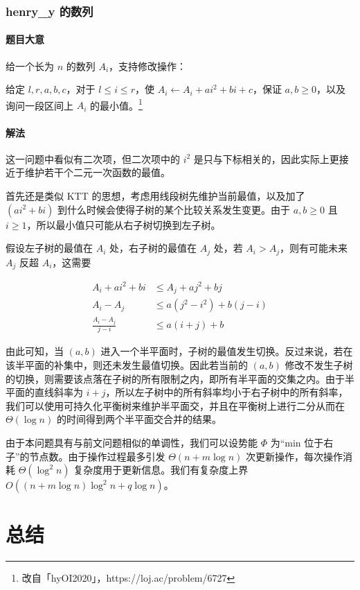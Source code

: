\documentclass{noithesis}
\begin{document}
\subsubsection{henry\_y 的数列}

\paragraph{题目大意} 给一个长为 $n$ 的数列 $A_i$，支持修改操作：

给定 $l, r, a, b, c$，对于 $l\le i\le r$，使 $A_i \leftarrow A_i + ai^2 + bi + c$，保证 $a, b\ge 0$，以及询问一段区间上 $A_i$ 的最小值。\footnote{改自「hyOI2020」，https://loj.ac/problem/6727}

\paragraph{解法} 这一问题中看似有二次项，但二次项中的 $i^2$ 是只与下标相关的，因此实际上更接近于维护若干个二元一次函数的最值。

首先还是类似 KTT 的思想，考虑用线段树先维护当前最值，以及加了 $(ai^2 + bi)$ 到什么时候会使得子树的某个比较关系发生变更。由于 $a, b\ge 0$ 且 $i\ge 1$，所以最小值只可能从右子树切换到左子树。

假设左子树的最值在 $A_i$ 处，右子树的最值在 $A_j$ 处，若 $A_i > A_j$，则有可能未来 $A_j$ 反超 $A_i$，这需要

\begin{align*}
A_i +ai^2 + bi &\le A_j + aj^2 + bj\\
A_i - A_j &\le a(j^2-i^2) + b(j-i)\\
\frac{A_i - A_j}{j-i} &\le  a(i+j) + b
\end{align*}

由此可知，当 $(a, b)$ 进入一个半平面时，子树的最值发生切换。反过来说，若在该半平面的补集中，则还未发生最值切换。因此若当前的 $(a, b)$ 修改不发生子树的切换，则需要该点落在子树的所有限制之内，即所有半平面的交集之内。由于半平面的直线斜率为 $i+j$，所以左子树中的所有斜率均小于右子树中的所有斜率，我们可以使用可持久化平衡树来维护半平面交，并且在平衡树上进行二分从而在 $\Theta(\log n)$ 的时间得到两个半平面交合并的结果。

由于本问题具有与前文问题相似的单调性，我们可以设势能 $\Phi$ 为“min 位于右子”的节点数。由于操作过程最多引发 $\Theta(n + m\log n)$ 次更新操作，每次操作消耗 $\Theta(\log^2n)$ 复杂度用于更新信息。我们有复杂度上界 $O((n + m\log n)\log^2 n + q\log n)$。

\section{总结}
\end{document}
